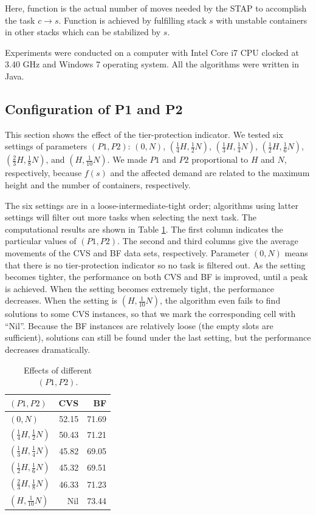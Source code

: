 \documentclass[review,3p,times,12pt,number]{elsarticle}\usepackage{amsmath}\usepackage{amssymb}
\begin{document}
Here, function  is the actual number of moves needed by the STAP to accomplish the task $c\rightarrow s$. Function  is achieved by fulfilling stack $s$ with unstable containers in other stacks which can be stabilized by $s$.

Experiments were conducted on a computer with Intel Core i7 CPU clocked at 3.40 GHz and Windows 7 operating system. All the algorithms were written in Java.

\subsection{Configuration of P1 and P2}
This section shows the effect of the tier-protection indicator. We tested six settings of parameters $(P1,P2)$: $(0,N)$, $(\frac{1}{4}H,\frac{1}{2}N)$, $(\frac{1}{3}H,\frac{1}{4}N)$, $(\frac{1}{2}H,\frac{1}{6}N)$, $(\frac{2}{3}H,\frac{1}{8}N)$, and $(H,\frac{1}{10}N)$. We made $P1$ and $P2$ proportional to $H$ and $N$, respectively, because $f(s)$  and the affected demand are related to the maximum height and the number of containers, respectively.

The six settings are in a loose-intermediate-tight order; algorithms using latter settings will filter out more tasks when selecting the next task. The computational results are shown in Table \ref{tab:tier-protection}.
The first column indicates the particular values of $(P1,P2)$. The second and third columns give the average movements of the CVS and BF data sets, respectively.
Parameter $(0,N)$ means that there is no tier-protection indicator so no task is filtered out.
As the setting becomes tighter, the performance on both CVS and BF is improved, until a peak is achieved.
When the setting becomes extremely tight, the performance decreases.
When the setting is $(H,\frac{1}{10}N)$, the algorithm even fails to find solutions to some CVS instances, so that we mark the corresponding cell with ``Nil''. Because the BF instances are relatively loose (the empty slots are sufficient), solutions can still be found under the last setting, but the performance decreases dramatically.
\begin{table}[htbp]
  \centering
  \caption{Effects of different $(P1,P2)$.}
    \begin{tabular}{lrr}
    \toprule
    $(P1,P2)$ & CVS   & BF \\
    \midrule
    $(0,N)$   & 52.15 & 71.69 \\
    $(\frac{1}{4}H,\frac{1}{2}N)$ & 50.43 & 71.21 \\
    $(\frac{1}{3}H,\frac{1}{4}N)$ & 45.82 & 69.05 \\
    $(\frac{1}{2}H,\frac{1}{6}N)$ & 45.32 & 69.51 \\
    $(\frac{2}{3}H,\frac{1}{8}N)$ & 46.33 & 71.23 \\
    $(H,\frac{1}{10}N)$ & Nil   & 73.44 \\
    \bottomrule
    \end{tabular}
  \label{tab:tier-protection}
\end{table}
\end{document}
